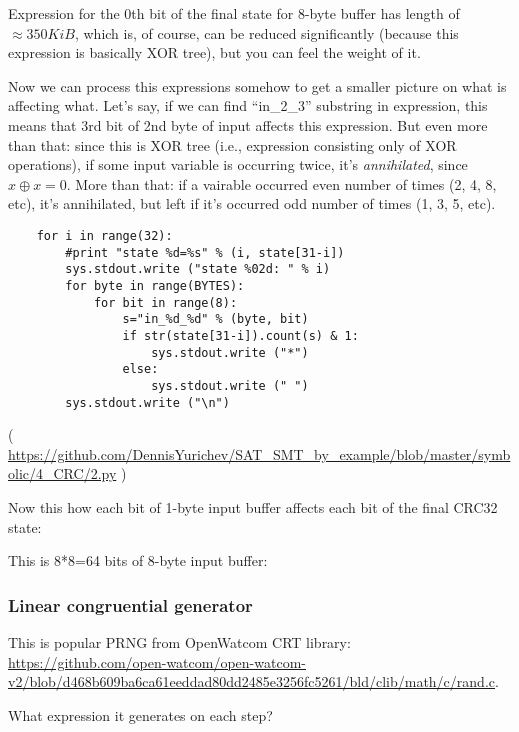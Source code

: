 Expression for the 0th bit of the final state for 8-byte buffer has length of $\approx 350KiB$,
which is, of course, can be reduced
significantly (because this expression is basically XOR tree), but you can feel the weight of it.

Now we can process this expressions somehow to get a smaller picture on what is affecting what.
Let's say, if we can find ``in\_2\_3'' substring in expression, this means that 3rd bit of 2nd byte of input
affects this expression.
But even more than that: since this is XOR tree (i.e., expression consisting only of XOR operations),
if some input variable is occurring twice, it's \textit{annihilated}, since $x \oplus x=0$.
More than that: if a vairable occurred even number of times (2, 4, 8, etc), it's annihilated, but left if it's occurred
odd number of times (1, 3, 5, etc).

\begin{lstlisting}
    for i in range(32):
        #print "state %d=%s" % (i, state[31-i])
        sys.stdout.write ("state %02d: " % i)
        for byte in range(BYTES):
            for bit in range(8):
                s="in_%d_%d" % (byte, bit)
                if str(state[31-i]).count(s) & 1:
                    sys.stdout.write ("*")
                else:
                    sys.stdout.write (" ")
        sys.stdout.write ("\n")
\end{lstlisting}

( \url{https://github.com/DennisYurichev/SAT_SMT_by_example/blob/master/symbolic/4_CRC/2.py} )

Now this how each bit of 1-byte input buffer affects each bit of the final CRC32 state:



This is 8*8=64 bits of 8-byte input buffer:



\subsubsection{Linear congruential generator}

This is popular \ac{PRNG} from OpenWatcom \ac{CRT} library: \url{https://github.com/open-watcom/open-watcom-v2/blob/d468b609ba6ca61eeddad80dd2485e3256fc5261/bld/clib/math/c/rand.c}.

What expression it generates on each step?



